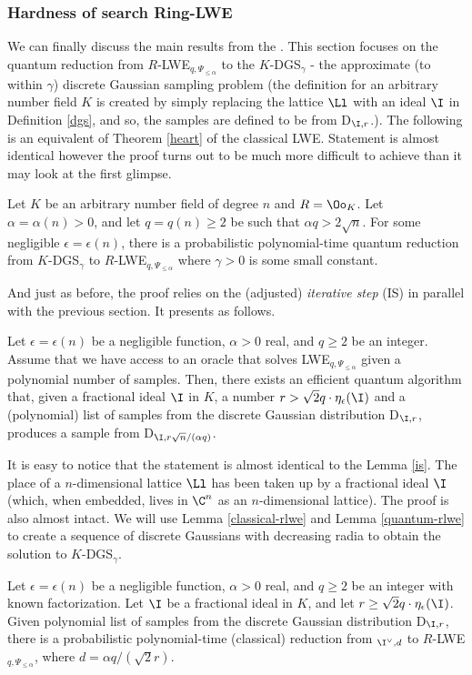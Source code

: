 \subsubsection{Hardness of search Ring-LWE}\label{h-rlwe}
We can finally discuss the main results from the \cite{ring-lwe}. This section focuses on the quantum reduction from $R$-LWE$_{q, \Psi_{\leq \alpha}}$ to the $K$-DGS$_{\gamma}$ - the approximate (to within $\gamma$) discrete Gaussian sampling problem (the definition for an arbitrary number field $K$ is created by simply replacing the lattice $\Ll$ with an ideal $\I$ in Definition \ref{dgs}, and so, the samples are defined to be from D$_{\I, r}$.).
The following is an equivalent of Theorem \ref{heart} of the classical LWE. Statement is almost identical however the proof turns out to be much more difficult to achieve than it may look at the first glimpse.
\begin{theorem}
	Let $K$ be an arbitrary number field of degree $n$ and $R = \Oo_K$. Let $\alpha = \alpha(n) > 0$, and let $q = q(n) \geq 2$ be such that $\alpha q > 2 \sqrt{n}$. For some negligible $\epsilon = \epsilon(n)$, there is a probabilistic polynomial-time quantum reduction from $K$-DGS$_{\gamma}$ to $R$-LWE$_{q,\Psi_{\leq \alpha}}$ where $\gamma > 0$ is some small constant.
\end{theorem}
And just as before, the proof relies on the (adjusted) \textit{iterative step} (IS) in parallel with the previous section. It presents as follows.
\begin{lemma}
Let $\epsilon = \epsilon(n)$ be a negligible function, $\alpha > 0$ real, and $q \geq 2$ be an integer. Assume that we have access to an oracle that solves LWE$_{q, \Psi_{\leq \alpha}}$ given a polynomial number of samples. Then, there exists an efficient quantum algorithm that, given a fractional ideal $\I$ in $K$, a number $r > \sqrt{2}q \cdot \eta_{\epsilon}(\I)$ and a (polynomial) list of samples from the discrete Gaussian distribution D$_{\I,r}$, produces a sample from D$_{\I,r\sqrt{n}/(\alpha q)}$.	
\end{lemma}
It is easy to notice that the statement is almost identical to the Lemma \ref{is}. The place of a $n$-dimensional lattice $\Ll$ has been taken up by a fractional ideal $\I$ (which, when embedded, lives in $\C^n$ as an $n$-dimensional lattice). The proof is also almost intact. We will use Lemma \ref{classical-rlwe} and Lemma \ref{quantum-rlwe} to create a sequence of discrete Gaussians with decreasing radia to obtain the solution to $K$-DGS$_{\gamma}$.
\begin{lemma}\label{classical-rlwe}
	Let $\epsilon = \epsilon(n)$ be a negligible function, $\alpha > 0$ real, and $q \geq 2$ be an integer with known factorization. Let $\I$ be a fractional ideal in $K$, and let $r \geq \sqrt{2}q \cdot \eta_{\epsilon}(\I)$. Given polynomial list of samples from the discrete Gaussian distribution D$_{\I,r}$, there is a probabilistic polynomial-time (classical) reduction from $_{\I^{\vee},d}$ to $R$-LWE$_{q,\Psi_{\leq \alpha}}$, where $d = \alpha q/(\sqrt{2}r)$.
\end{lemma}
